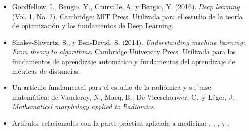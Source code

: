 \begin{itemize}
    \item Goodfellow, I., Bengio, Y., Courville, A. y Bengio, Y. (2016). \textit{Deep learning} (Vol. 1, No. 2). Cambridge: MIT Press. Utilizada para el estudio de la teoría de optimización y los fundamentos de Deep Learning. 
    \item Shalev-Shwartz, S., y Ben-David, S. (2014). \textit{Understanding machine learning: From theory to algorithms}. Cambridge University Press. Utilizada para los fundamentos de aprendizaje automático y fundamentos del aprendizaje de métricas de distancias.
    \item Un artículo fundamental para el estudio de la radiómica y su base matemática: de Vaucleroy, N., Macq, B., De Vleeschouwer, C., y Léger, J. \textit{Mathematical morphology applied to Radiomics}.
    \item Artículos relacionados con la parte práctica aplicada a medicina: \cite{shur2021radiomics}, \cite{mukherjee2022radiomics}, \cite{suara2023grad}, \cite{calzado2010tomografia} y \cite{shen2017deep}. 
\end{itemize}



\endinput
